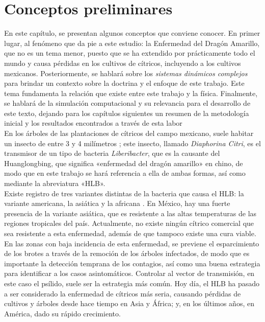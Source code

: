 \chapter{Conceptos preliminares}
En este capítulo, se presentan algunos conceptos que conviene conocer. En primer lugar, al fenómeno que da pie a este estudio: la Enfermedad del Dragón Amarillo, que no es un tema menor, puesto que se ha extendido por prácticamente todo el mundo y causa pérdidas en los cultivos de cítricos, incluyendo a los cultivos mexicanos. Posteriormente, se hablará sobre los \textit{sistemas dinámicos complejos} para brindar un contexto sobre la doctrina y el enfoque de este trabajo. Este tema fundamenta la relación que existe entre este trabajo y la física. Finalmente, se hablará de la simulación computacional y su relevancia para el desarrollo de este texto, dejando para los capítulos siguientes un resumen de la metodología inicial y los resultados encontrados a través de esta labor\\
En los árboles de las plantaciones de cítricos del campo mexicano, suele habitar un insecto de entre 3 y 4 milímetros \cite{aleman2007diaphorina}; este insecto, llamado \textit{Diaphorina Citri}, es el transmisor de un tipo de bacteria \textit{Liberibacter}, que es la causante del Huanglongbing, que significa «enfermedad del dragón amarillo» en chino, de modo que en este trabajo se hará referencia a ella de ambas formas, así como mediante la abreviatura «HLB».\\
Existe registro de tres variantes distintas de la bacteria que causa el HLB: la variante americana, la asiática y la africana \cite{senasica2017manual}. En México, hay una fuerte presencia de la variante asiática, que es resistente a las altas temperaturas de las regiones tropicales del país. Actualmente, no existe ningún cítrico comercial que sea resistente a esta enfermedad, además de que tampoco existe una cura viable. En las zonas con baja incidencia de esta enfermedad, se previene el esparcimiento de los brotes a través de la remoción de los árboles infectados, de modo que es importante la detección temprana de los contagios, así como una buena estrategia para identificar a los casos asintomáticos. Controlar al vector de transmisión, en este caso el psílido, suele ser la estrategia más común. Hoy día, el HLB ha pasado a ser considerado la enfermedad de cítricos más seria, causando pérdidas de cultivos y árboles desde hace tiempo en Asia y África; y, en los últimos años, en América, dado su rápido crecimiento.\cite{robles2012protocolo}\\

